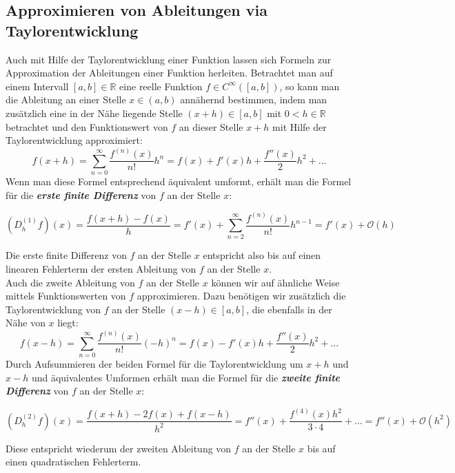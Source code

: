 \documentclass{scrartcl}
\begin{document}
\subsection{Approximieren von Ableitungen via Taylorentwicklung}
\label{ssec:herleitung2}
Auch mit Hilfe der Taylorentwicklung einer Funktion lassen sich Formeln zur Approximation der Ableitungen einer Funktion herleiten. Betrachtet man auf einem Intervall $[a,b] \in \mathbb{R}$ eine reelle Funktion $f \in C^\infty([a,b])$, so kann man die Ableitung an einer Stelle $x \in (a,b)$ annähernd bestimmen, indem man zusätzlich eine in der Nähe liegende Stelle $(x+h) \in [a,b]$ mit $0<h \in \mathbb{R}$ betrachtet und den Funktionswert von $f$ an dieser Stelle $x+h$ mit Hilfe der Taylorentwicklung approximiert:
\[f(x+h) = \sum_{n=0}^{\infty}\frac{f^{(n)}(x)}{n!}h^n = f(x)+f'(x)h+\frac{f''(x)}{2}h^2+...\]
Wenn man diese Formel entsprechend äquivalent umformt, erhält man die Formel für die \textbf{\textit{erste finite Differenz}} von $f$ an der Stelle $x$:
\begin{shaded}
\[(D_h^{(1)}f)(x) = \frac{f(x+h)-f(x)}{h} = f'(x)+\sum_{n=2}^{\infty}\frac{f^{(n)}(x)}{n!}h^{n-1}=f'(x)+\mathcal{O}(h)\;\]
\end{shaded}
Die erste finite Differenz von $f$ an der Stelle $x$ entspricht also bis auf einen linearen Fehlerterm der ersten Ableitung von $f$ an der Stelle $x$. \\
Auch die zweite Ableitung von $f$ an der Stelle $x$ können wir auf ähnliche Weise mittels Funktionswerten von $f$ approximieren. Dazu benötigen wir zusätzlich die Taylorentwicklung von $f$ an der Stelle $(x-h) \in [a,b]$, die ebenfalls in der Nähe von $x$ liegt:
\[f(x-h) = \sum_{n=0}^{\infty}\frac{f^{(n)}(x)}{n!}(-h)^n = f(x)-f'(x)h+\frac{f''(x)}{2}h^2+...\]
Durch Aufsummieren der beiden Formel für die Taylorentwicklung um $x+h$ und $x-h$ und äquivalentes Umformen erhält man die Formel für die \textbf{\textit{zweite finite Differenz}} von $f$ an der Stelle $x$:
\begin{shaded}
\[(D_h^{(2)}f)(x) = \frac{f(x+h)-2f(x)+f(x-h)}{h^2} = f''(x)+\frac{f^{(4)}(x)h^2}{3\cdot4}+...=f''(x)+\mathcal{O}(h^2)\;\]
\end{shaded}
Diese entspricht wiederum der zweiten Ableitung von $f$ an der Stelle $x$ bis auf einen quadratischen Fehlerterm.
\end{document}
